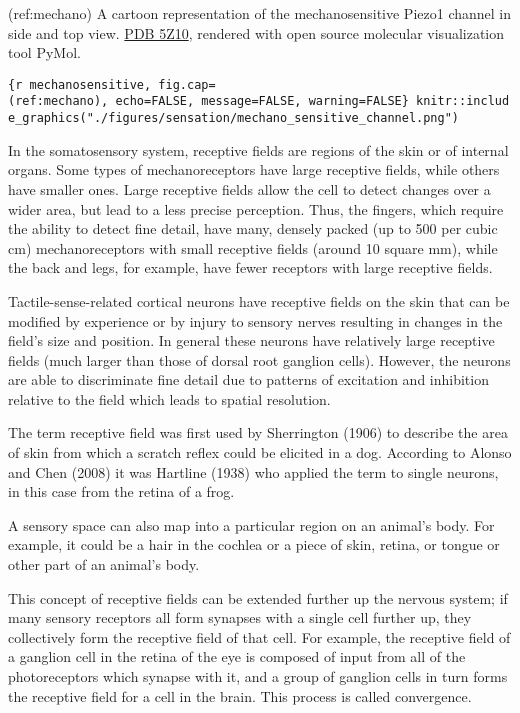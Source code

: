 (ref:mechano) A cartoon representation of the mechanosensitive Piezo1
channel in side and top view.
\href{https://www.rcsb.org/structure/5Z10}{PDB 5Z10}, rendered with open
source molecular visualization tool PyMol.

\texttt{\{r\ mechanosensitive,\ fig.cap=\textquotesingle{}(ref:mechano)\textquotesingle{},\ echo=FALSE,\ message=FALSE,\ warning=FALSE\}\ knitr::include\_graphics("./figures/sensation/mechano\_sensitive\_channel.png")}

In the somatosensory system, receptive fields are regions of the skin or
of internal organs. Some types of mechanoreceptors have large receptive
fields, while others have smaller ones. Large receptive fields allow the
cell to detect changes over a wider area, but lead to a less precise
perception. Thus, the fingers, which require the ability to detect fine
detail, have many, densely packed (up to 500 per cubic cm)
mechanoreceptors with small receptive fields (around 10 square mm),
while the back and legs, for example, have fewer receptors with large
receptive fields.

Tactile-sense-related cortical neurons have receptive fields on the skin
that can be modified by experience or by injury to sensory nerves
resulting in changes in the field's size and position. In general these
neurons have relatively large receptive fields (much larger than those
of dorsal root ganglion cells). However, the neurons are able to
discriminate fine detail due to patterns of excitation and inhibition
relative to the field which leads to spatial resolution.

The term receptive field was first used by Sherrington (1906) to
describe the area of skin from which a scratch reflex could be elicited
in a dog. According to Alonso and Chen (2008) it was Hartline (1938) who
applied the term to single neurons, in this case from the retina of a
frog.

A sensory space can also map into a particular region on an animal's
body. For example, it could be a hair in the cochlea or a piece of skin,
retina, or tongue or other part of an animal's body.

This concept of receptive fields can be extended further up the nervous
system; if many sensory receptors all form synapses with a single cell
further up, they collectively form the receptive field of that cell. For
example, the receptive field of a ganglion cell in the retina of the eye
is composed of input from all of the photoreceptors which synapse with
it, and a group of ganglion cells in turn forms the receptive field for
a cell in the brain. This process is called convergence.

